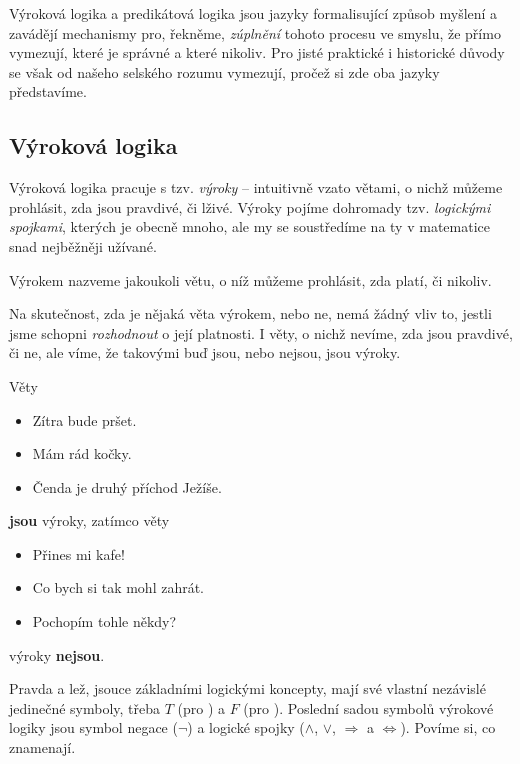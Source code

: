 Výroková logika a predikátová logika jsou jazyky formalisující 
způsob myšlení a zavádějí mechanismy pro, řekněme, \emph{zúplnění} tohoto
procesu ve smyslu, že přímo vymezují, které  je správné a které
nikoliv. Pro jisté praktické i historické důvody se však od našeho selského
rozumu vymezují, pročež si zde oba jazyky představíme.

\subsection{Výroková logika}
\label{ssec:vyrokova-logika}

Výroková logika pracuje s tzv. \emph{výroky} -- intuitivně vzato větami, o nichž
můžeme prohlásit, zda jsou pravdivé, či lživé. Výroky pojíme dohromady tzv.
\emph{logickými spojkami}, kterých je obecně mnoho, ale my se soustředíme na ty
v matematice snad nejběžněji užívané.

\begin{definition}[Výrok]
  \label{def:vyrok}
  Výrokem nazveme jakoukoli větu, o níž můžeme prohlásit, zda platí, či nikoliv.
\end{definition}
\lessboxspace
\begin{warning}
  Na skutečnost, zda je nějaká věta výrokem, nebo ne, nemá žádný vliv to, jestli
  jsme schopni \emph{rozhodnout} o její platnosti. I věty, o nichž nevíme, zda
  jsou pravdivé, či ne, ale víme, že takovými buď jsou, nebo nejsou, jsou
  výroky.
\end{warning}
\begin{example}
  \label{exam:vyrok}
  Věty
  \begin{itemize}
    \item Zítra bude pršet.
    \item Mám rád kočky.
    \item Čenda je druhý příchod Ježíše.
  \end{itemize}
  \textbf{jsou} výroky, zatímco věty
  \begin{itemize}
    \item Přines mi kafe!
    \item Co bych si tak mohl zahrát.
    \item Pochopím tohle někdy?
  \end{itemize}
  výroky \textbf{nejsou}.
\end{example}

Pravda a lež, jsouce základními logickými koncepty, mají své vlastní nezávislé
jedinečné symboly, třeba $T$ (pro ) a $F$ (pro ). Poslední
sadou symbolů výrokové logiky jsou symbol negace ($\neg$) a logické spojky ($
\wedge $, $ \vee $, $ \Rightarrow $ a $ \Leftrightarrow $). Povíme si, co
znamenají.

